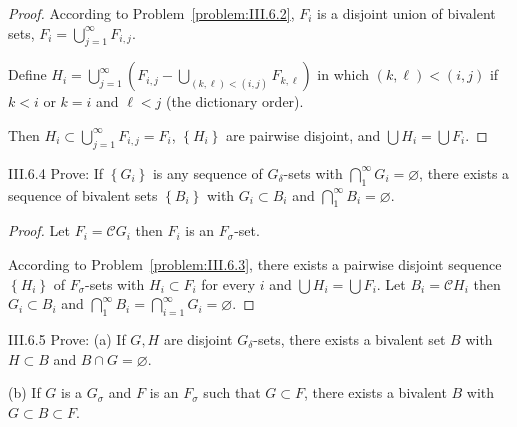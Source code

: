 \begin{proof}
    According to Problem~\ref{problem:III.6.2}, \( F_{i} \) is a disjoint union of bivalent sets, \( F_{i} = \bigcup^{\infty}_{j=1} F_{i,j} \).

    Define \( H_{i} = \bigcup^{\infty}_{j=1} \left(F_{i,j} - \bigcup_{(k,\ell) < (i,j)} F_{k,\ell}\right) \) in which \( (k,\ell) < (i,j) \) if \( k < i \) or \( k = i \) and \( \ell < j \) (the dictionary order).

    Then \( H_{i} \subset \bigcup^{\infty}_{j=1} F_{i,j} = F_{i} \), \( \left\{ H_{i} \right\} \) are pairwise disjoint, and \( \bigcup H_{i} = \bigcup F_{i} \).
\end{proof}

\begin{problem}{III.6.4}\label{problem:III.6.4}
Prove: If \( \left\{ G_{i} \right\} \) is any sequence of \(G_{\delta}\)-sets with \( \bigcap^{\infty}_{1} G_{i} = \varnothing \), there exists a sequence of bivalent sets \( \left\{ B_{i} \right\} \) with \(G_{i} \subset B_{i}\) and \( \bigcap^{\infty}_{1} B_{i} = \varnothing \).
\end{problem}

\begin{proof}
    Let \( F_{i} = \mathscr{C}G_{i} \) then \( F_{i} \) is an \( F_{\sigma} \)-set.

    According to Problem~\ref{problem:III.6.3}, there exists a pairwise disjoint sequence \( \left\{ H_{i} \right\} \) of \(F_{\sigma}\)-sets with \(H_{i} \subset F_{i}\) for every \(i\) and \( \bigcup H_{i} = \bigcup F_{i} \). Let \( B_{i} = \mathscr{C}H_{i} \) then \( G_{i} \subset B_{i} \) and \( \bigcap^{\infty}_{1} B_{i} = \bigcap^{\infty}_{i=1} G_{i} = \varnothing \).
\end{proof}

\begin{problem}{III.6.5}
Prove: (a) If \(G, H\) are disjoint \(G_{\delta}\)-sets, there exists a bivalent set \(B\) with \(H \subset B\) and \( B \cap G = \varnothing \).

(b) If \(G\) is a \(G_{\sigma}\) and \(F\) is an \(F_{\sigma}\) such that \(G \subset F\), there exists a bivalent \(B\) with \( G \subset B \subset F \).
\end{problem}

